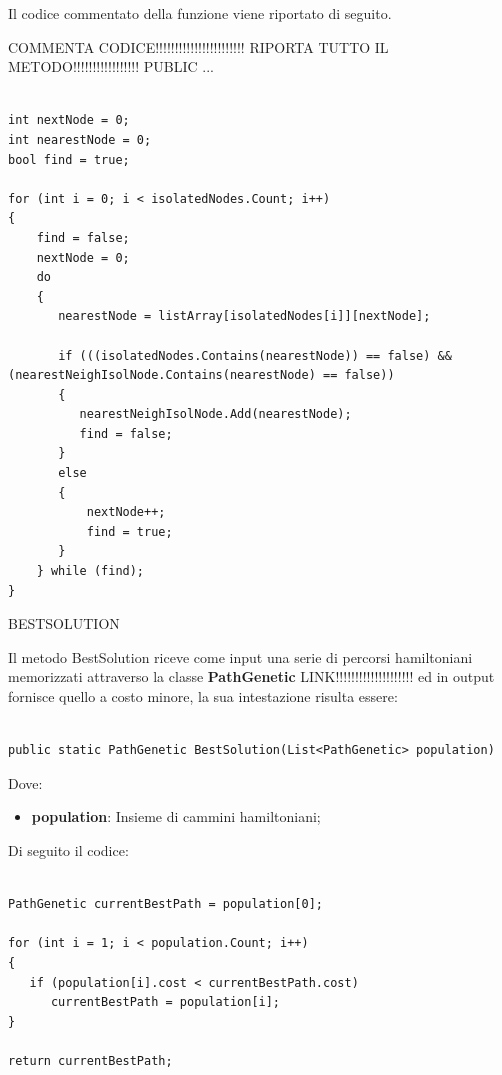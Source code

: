 \documentclass[11pt]{article}
\begin{document}
Il codice commentato della funzione viene riportato di seguito.

COMMENTA CODICE!!!!!!!!!!!!!!!!!!!!!!! RIPORTA TUTTO IL METODO!!!!!!!!!!!!!!!!! PUBLIC ...

\begin{lstlisting}

int nextNode = 0;
int nearestNode = 0;
bool find = true;

for (int i = 0; i < isolatedNodes.Count; i++)
{
    find = false;
    nextNode = 0;
    do
    {
       nearestNode = listArray[isolatedNodes[i]][nextNode];

       if (((isolatedNodes.Contains(nearestNode)) == false) && (nearestNeighIsolNode.Contains(nearestNode) == false))
       {
          nearestNeighIsolNode.Add(nearestNode);
          find = false;
       }
       else
       {
           nextNode++;
           find = true;
       }
    } while (find);
}

\end{lstlisting}

\vspace{2\baselineskip}
BESTSOLUTION
\vspace{2\baselineskip}

Il metodo BestSolution riceve come input una serie di percorsi hamiltoniani memorizzati attraverso la classe \textbf{PathGenetic} LINK!!!!!!!!!!!!!!!!!!!! ed in output fornisce quello a costo minore, la sua intestazione risulta essere:

\begin{lstlisting}

public static PathGenetic BestSolution(List<PathGenetic> population)

\end{lstlisting}

Dove:

\begin{itemize}
    \item \textbf{population}: Insieme di cammini hamiltoniani;
\end{itemize}

Di seguito il codice:

\begin{lstlisting}

PathGenetic currentBestPath = population[0];

for (int i = 1; i < population.Count; i++)
{
   if (population[i].cost < currentBestPath.cost)
      currentBestPath = population[i];
}

return currentBestPath;

\end{lstlisting}
\end{document}
